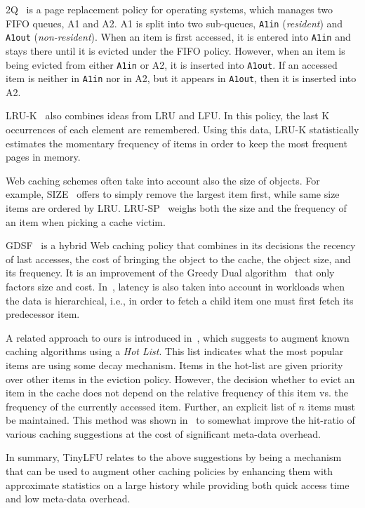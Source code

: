 \documentclass[10pt,a4paper]{article}
\begin{document}
2Q~\cite{2Q} is a page replacement policy for operating systems, which manages two FIFO queues, A1 and A2.
A1 is split into two sub-queues, \texttt{A1in} (\emph{resident}) and \texttt{A1out} (\emph{non-resident}).
When an item is first accessed, it is entered into \texttt{A1in} and stays there until it is evicted under the FIFO policy.
However, when an item is being evicted from either \texttt{A1in} or A2, it is inserted into \texttt{A1out}.
If an accessed item is neither in \texttt{A1in} nor in A2, but it appears in \texttt{A1out}, then it is inserted into A2.

LRU-K~\cite{LRUK} also combines ideas from LRU and LFU.
In this policy, the last K occurrences of each element are remembered.
Using this data, LRU-K statistically estimates the momentary frequency of items in order to keep the most frequent pages in memory.

Web caching schemes often take into account also the size of objects.
For example, SIZE~\cite{SIZE} offers to simply remove the largest item first, while same size items are ordered by LRU.
LRU-SP~\cite{LruSP} weighs both the size and the frequency of an item when picking a cache victim.

GDSF~\cite{GDSF} is a hybrid Web caching policy that combines in its decisions the recency of last accesses, the cost of bringing the object to the cache, the object size, and its frequency.
It is an improvement of the Greedy Dual algorithm~\cite{GD} that only factors size and cost. In~\cite{CORBA}, latency is also taken into account in workloads when the data is hierarchical, i.e., in order to fetch a child item one must first fetch its predecessor item.


A related approach to ours is introduced in~\cite{AdaptiveCacheReplacement}, which suggests to augment known caching algorithms using a \emph{Hot List}.
This list indicates what the most popular items are using some decay mechanism.
Items in the hot-list are given priority over other items in the eviction policy.
However, the decision whether to evict an item in the cache does not depend on the relative frequency of this item vs. the frequency of the currently accessed item.
Further, an explicit list of $n$ items must be maintained.
This method was shown in~\cite{AdaptiveCacheReplacement} to somewhat improve the hit-ratio of various caching suggestions at the cost of significant meta-data overhead.

In summary, TinyLFU relates to the above suggestions by being a mechanism that can be used to augment other caching policies by enhancing them with approximate statistics on a large history while providing both quick access time and low meta-data overhead.
\end{document}

